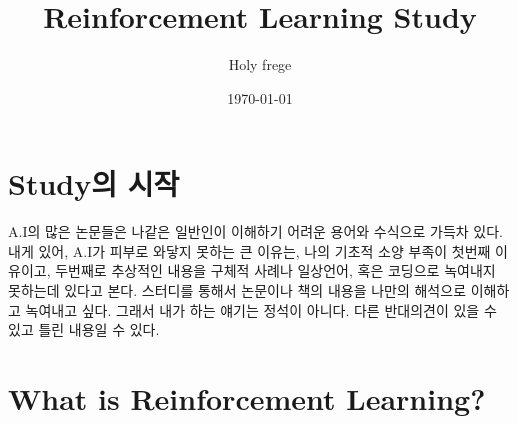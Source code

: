 \documentclass[11pt]{article}
\author{Holy frege}
\date{\today}
\title{Reinforcement Learning Study}
\begin{document}
\maketitle
\tableofcontents


\section{Study의 시작}
\label{sec:orgb5dda2e}

\begin{note}


A.I의 많은 논문들은 나같은 일반인이 이해하기 어려운 용어와 수식으로 가득차 있다. 내게 있어, A.I가  피부로 와닿지 못하는 큰 이유는, 나의 기초적 소양 부족이 첫번째 이유이고, 두번째로 추상적인 내용을 구체적 사례나 일상언어, 혹은 코딩으로 녹여내지 못하는데 있다고 본다. 스터디를 통해서 논문이나 책의 내용을 나만의 해석으로 이해하고 녹여내고 싶다. 그래서 내가 하는 얘기는 정석이 아니다. 다른 반대의견이 있을 수 있고 틀린 내용일 수 있다.
\end{note}

\section{What is Reinforcement  Learning?}
\label{sec:org57eda6f}
\end{document}

